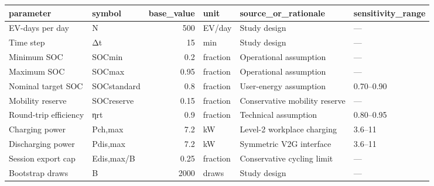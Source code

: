 \begin{tabular}{llrlll}
\toprule
parameter & symbol & base\_value & unit & source\_or\_rationale & sensitivity\_range \\
\midrule
EV-days per day & N & 500 & EV/day & Study design & — \\
Time step & Δt & 15 & min & Study design & — \\
Minimum SOC & SOCmin & 0.2 & fraction & Operational assumption & — \\
Maximum SOC & SOCmax & 0.95 & fraction & Operational assumption & — \\
Nominal target SOC & SOCstandard & 0.8 & fraction & User-energy assumption & 0.70–0.90 \\
Mobility reserve & SOCreserve & 0.15 & fraction & Conservative mobility reserve & — \\
Round-trip efficiency & ηrt & 0.9 & fraction & Technical assumption & 0.80–0.95 \\
Charging power & Pch,max & 7.2 & kW & Level-2 workplace charging & 3.6–11 \\
Discharging power & Pdis,max & 7.2 & kW & Symmetric V2G interface & 3.6–11 \\
Session export cap & Edis,max/B & 0.25 & fraction & Conservative cycling limit & — \\
Bootstrap draws & B & 2000 & draws & Study design & — \\
\bottomrule
\end{tabular}
